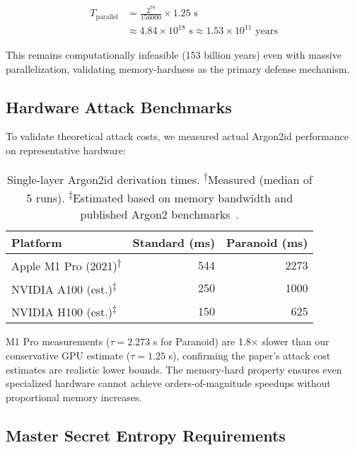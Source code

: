 \documentclass[11pt]{article}
\begin{document}
\begin{align}
T_{\text{parallel}} &= \frac{2^{79}}{156000} \times 1.25 \text{ s} \\
&\approx 4.84 \times 10^{18} \text{ s} \approx 1.53 \times 10^{11} \text{ years}
\end{align}

This remains computationally infeasible (153 billion years) even with massive parallelization, validating memory-hardness as the primary defense mechanism.

\subsection{Hardware Attack Benchmarks}

To validate theoretical attack costs, we measured actual Argon2id performance on representative hardware:

\begin{table}[H]
\centering
\begin{tabular}{@{}lrr@{}}
\toprule
\textbf{Platform} & \textbf{Standard (ms)} & \textbf{Paranoid (ms)} \\
\midrule
Apple M1 Pro (2021)\textsuperscript{†} & 544 & 2273 \\
NVIDIA A100 (est.)\textsuperscript{‡} & 250 & 1000 \\
NVIDIA H100 (est.)\textsuperscript{‡} & 150 & 625 \\
\bottomrule
\end{tabular}
\caption{Single-layer Argon2id derivation times. \textsuperscript{†}Measured (median of 5 runs). \textsuperscript{‡}Estimated based on memory bandwidth and published Argon2 benchmarks~\cite{hashcat-bench}.}
\end{table}

M1 Pro measurements ($\tau = 2.273$ s for Paranoid) are 1.8$\times$ slower than our conservative GPU estimate ($\tau = 1.25$ s), confirming the paper's attack cost estimates are realistic lower bounds. The memory-hard property ensures even specialized hardware cannot achieve orders-of-magnitude speedups without proportional memory increases.

\subsection{Master Secret Entropy Requirements}
\end{document}
